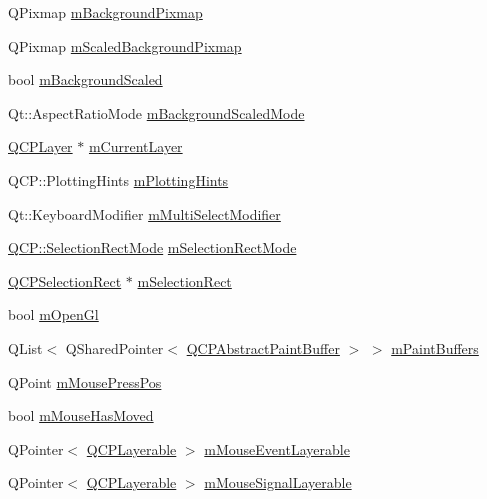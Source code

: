 \begin{DoxyCompactItemize}
\item 
Q\+Pixmap \hyperlink{class_q_custom_plot_ae8f4677399324a78c5f8dbfb95a34f90}{m\+Background\+Pixmap}
\item 
Q\+Pixmap \hyperlink{class_q_custom_plot_a081bf046501d52642dc6d7e3bdb97d57}{m\+Scaled\+Background\+Pixmap}
\item 
bool \hyperlink{class_q_custom_plot_a62fe584b20680b1b2e1c7efb5c5416a5}{m\+Background\+Scaled}
\item 
Qt\+::\+Aspect\+Ratio\+Mode \hyperlink{class_q_custom_plot_ab82e8a5e3ad6b486f95d6da8bf49e9aa}{m\+Background\+Scaled\+Mode}
\item 
\hyperlink{class_q_c_p_layer}{Q\+C\+P\+Layer} $\ast$ \hyperlink{class_q_custom_plot_aa27569c92e74395af10151357d268628}{m\+Current\+Layer}
\item 
Q\+C\+P\+::\+Plotting\+Hints \hyperlink{class_q_custom_plot_aa184197a6101a9cc5807469e1d006c9e}{m\+Plotting\+Hints}
\item 
Qt\+::\+Keyboard\+Modifier \hyperlink{class_q_custom_plot_a0e97e701c5671e7e463d2ce0211d0f8a}{m\+Multi\+Select\+Modifier}
\item 
\hyperlink{namespace_q_c_p_ac9aa4d6d81ac76b094f9af9ad2d3aacf}{Q\+C\+P\+::\+Selection\+Rect\+Mode} \hyperlink{class_q_custom_plot_abe04c5def373cc4fede8de20542ca3f2}{m\+Selection\+Rect\+Mode}
\item 
\hyperlink{class_q_c_p_selection_rect}{Q\+C\+P\+Selection\+Rect} $\ast$ \hyperlink{class_q_custom_plot_a4827bc84ef5ce52dfbf9ff630ed1b276}{m\+Selection\+Rect}
\item 
bool \hyperlink{class_q_custom_plot_a0841dbea13bd120d20e3f0cc36767ff9}{m\+Open\+Gl}
\item 
Q\+List$<$ Q\+Shared\+Pointer$<$ \hyperlink{class_q_c_p_abstract_paint_buffer}{Q\+C\+P\+Abstract\+Paint\+Buffer} $>$ $>$ \hyperlink{class_q_custom_plot_a57b270b1e3990e0d1b9fb39b137d5a5d}{m\+Paint\+Buffers}
\item 
Q\+Point \hyperlink{class_q_custom_plot_ac57090da95056ae4dd67be67adfa85bd}{m\+Mouse\+Press\+Pos}
\item 
bool \hyperlink{class_q_custom_plot_ad2108936f001a8be5974b0b6ff13dae3}{m\+Mouse\+Has\+Moved}
\item 
Q\+Pointer$<$ \hyperlink{class_q_c_p_layerable}{Q\+C\+P\+Layerable} $>$ \hyperlink{class_q_custom_plot_a243867f445d2f4e35e00add2f589e1da}{m\+Mouse\+Event\+Layerable}
\item 
Q\+Pointer$<$ \hyperlink{class_q_c_p_layerable}{Q\+C\+P\+Layerable} $>$ \hyperlink{class_q_custom_plot_adf81640dbf365bd4fa22494e3e504e70}{m\+Mouse\+Signal\+Layerable}

\end{DoxyCompactItemize}
